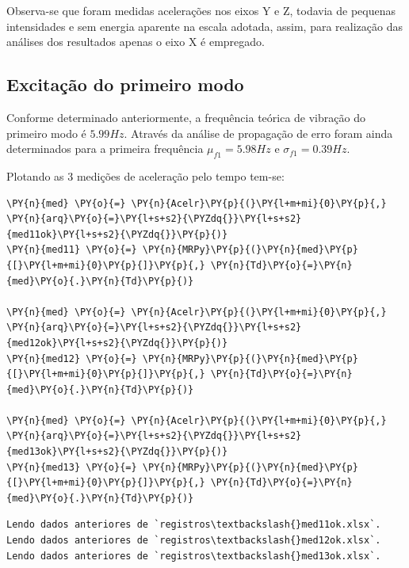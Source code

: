     Observa-se que foram medidas acelerações nos eixos Y e Z, todavia de
pequenas intensidades e sem energia aparente na escala adotada, assim,
para realização das análises dos resultados apenas o eixo X é empregado.

    \hypertarget{excitauxe7uxe3o-do-primeiro-modo}{%
\subsection{Excitação do primeiro
modo}\label{excitauxe7uxe3o-do-primeiro-modo}}

Conforme determinado anteriormente, a frequência teórica de vibração do
primeiro modo é \(5.99 Hz\). Através da análise de propagação de erro
foram ainda determinados para a primeira frequência \(\mu_{f1}=5.98 Hz\)
e \(\sigma_{f1}=0.39 Hz\).

Plotando as 3 medições de aceleração pelo tempo tem-se:

    \begin{tcolorbox}[breakable, size=fbox, boxrule=1pt, pad at break*=1mm,colback=cellbackground, colframe=cellborder]
\begin{Verbatim}[commandchars=\\\{\}]
\PY{n}{med} \PY{o}{=} \PY{n}{Acelr}\PY{p}{(}\PY{l+m+mi}{0}\PY{p}{,} \PY{n}{arq}\PY{o}{=}\PY{l+s+s2}{\PYZdq{}}\PY{l+s+s2}{med11ok}\PY{l+s+s2}{\PYZdq{}}\PY{p}{)}
\PY{n}{med11} \PY{o}{=} \PY{n}{MRPy}\PY{p}{(}\PY{n}{med}\PY{p}{[}\PY{l+m+mi}{0}\PY{p}{]}\PY{p}{,} \PY{n}{Td}\PY{o}{=}\PY{n}{med}\PY{o}{.}\PY{n}{Td}\PY{p}{)}

\PY{n}{med} \PY{o}{=} \PY{n}{Acelr}\PY{p}{(}\PY{l+m+mi}{0}\PY{p}{,} \PY{n}{arq}\PY{o}{=}\PY{l+s+s2}{\PYZdq{}}\PY{l+s+s2}{med12ok}\PY{l+s+s2}{\PYZdq{}}\PY{p}{)}
\PY{n}{med12} \PY{o}{=} \PY{n}{MRPy}\PY{p}{(}\PY{n}{med}\PY{p}{[}\PY{l+m+mi}{0}\PY{p}{]}\PY{p}{,} \PY{n}{Td}\PY{o}{=}\PY{n}{med}\PY{o}{.}\PY{n}{Td}\PY{p}{)}

\PY{n}{med} \PY{o}{=} \PY{n}{Acelr}\PY{p}{(}\PY{l+m+mi}{0}\PY{p}{,} \PY{n}{arq}\PY{o}{=}\PY{l+s+s2}{\PYZdq{}}\PY{l+s+s2}{med13ok}\PY{l+s+s2}{\PYZdq{}}\PY{p}{)}
\PY{n}{med13} \PY{o}{=} \PY{n}{MRPy}\PY{p}{(}\PY{n}{med}\PY{p}{[}\PY{l+m+mi}{0}\PY{p}{]}\PY{p}{,} \PY{n}{Td}\PY{o}{=}\PY{n}{med}\PY{o}{.}\PY{n}{Td}\PY{p}{)}
\end{Verbatim}
\end{tcolorbox}

    \begin{Verbatim}[commandchars=\\\{\}]
Lendo dados anteriores de `registros\textbackslash{}med11ok.xlsx`.
Lendo dados anteriores de `registros\textbackslash{}med12ok.xlsx`.
Lendo dados anteriores de `registros\textbackslash{}med13ok.xlsx`.
    \end{Verbatim}

